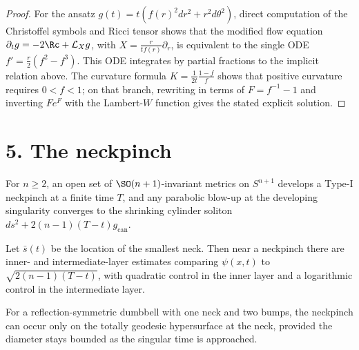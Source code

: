 \begin{proof}
\sketch For the ansatz \(g(t)=t(f(r)^2dr^2+r^2d\theta^2)\), direct computation of the
Christoffel symbols and Ricci tensor shows that the modified flow equation
\(\partial_t g=-2\Rc+\mathcal L_X g\), with
\(X=\frac{r}{tf(r)}\partial_r\), is equivalent to the single ODE
\(f'=\frac r2(f^2-f^3)\). This ODE integrates by partial fractions to the
implicit relation above. The curvature formula
\(K=\frac1{2t}\frac{1-f}{f}\) shows that positive curvature requires
\(0<f<1\); on that branch, rewriting in terms of \(F=f^{-1}-1\) and inverting
\(Fe^F\) with the Lambert-\(W\) function gives the stated explicit solution.
\end{proof}

\section*{5. The neckpinch}

\begin{theorem}
\label{ch02-thm-neckpinch-rigorous}
For \(n\ge 2\), an open set of \(\SO(n+1)\)-invariant metrics on \(S^{n+1}\)
develops a Type-I neckpinch at a finite time \(T\), and any parabolic blow-up
at the developing singularity converges to the shrinking cylinder soliton
\(ds^2+2(n-1)(T-t)g_{\mathrm{can}}\).
\end{theorem}

\begin{theorem}
\label{ch02-thm-neckpinch-asymptotics}
Let \(\bar s(t)\) be the location of the smallest neck. Then near a neckpinch
there are inner- and intermediate-layer estimates comparing \(\psi(x,t)\) to
\(\sqrt{2(n-1)(T-t)}\), with quadratic control in the inner layer and a logarithmic
control in the intermediate layer.
\end{theorem}

\begin{remark}
\label{ch02-rem-single-point-pinching}
For a reflection-symmetric dumbbell with one neck and two bumps, the
neckpinch can occur only on the totally geodesic hypersurface at the neck,
provided the diameter stays bounded as the singular time is approached.
\end{remark}


